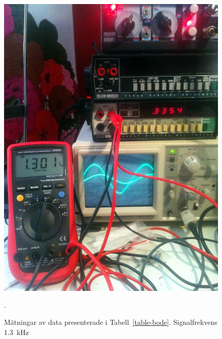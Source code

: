 \begin{figure}\label{fig:bode-foto-1300}
  \centering
  \includegraphics[width=\linewidth]{img/bode_1300Hz.jpg}
  \caption[] {Mätningar av data presenterade i Tabell~\ref{table-bode}.
              Signalfrekvens \SI{1.3}{\kHz}}.
\end{figure}

